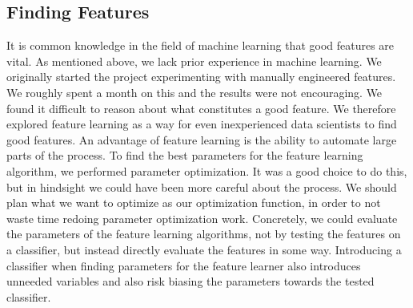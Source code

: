 \subsection{Finding Features}
It is common knowledge in the field of machine learning that good features are vital. As mentioned above, we lack prior experience in machine learning. We originally started the project experimenting with manually engineered features. We roughly spent a month on this and the results were not encouraging. We found it difficult to reason about what constitutes a good feature. We therefore explored feature learning as a way for even inexperienced data scientists to find good features. An advantage of feature learning is the ability to automate large parts of the process. To find the best parameters for the feature learning algorithm, we performed parameter optimization. It was a good choice to do this, but in hindsight we could have been more careful about the process. We should plan what we want to optimize as our optimization function, in order to not waste time redoing parameter optimization work. Concretely, we could evaluate the parameters of the feature learning algorithms, not by testing the features on a classifier, but instead directly evaluate the features in some way. Introducing a classifier when finding parameters for the feature learner also introduces unneeded variables and also risk biasing the parameters towards the tested classifier.


